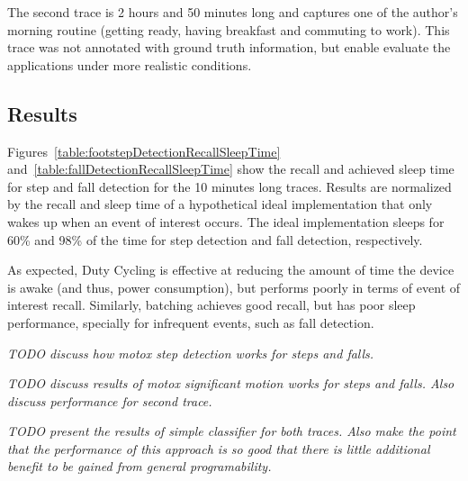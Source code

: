 The second trace is 2 hours and 50 minutes long and captures one of
the author's morning routine (getting ready, having breakfast and
commuting to work). This trace was not annotated with ground truth
information, but enable evaluate the applications under more realistic
conditions.

\subsection{Results}

Figures~\ref{table:footstepDetectionRecallSleepTime}
and~\ref{table:fallDetectionRecallSleepTime} show the recall and
achieved sleep time for step and fall detection for the 10 minutes
long traces.  Results are normalized by the recall and sleep time of a
hypothetical ideal implementation that only wakes up when an event of
interest occurs.  The ideal implementation sleeps for 60\% and 98\% of
the time for step detection and fall detection, respectively.

As expected, Duty Cycling is effective at reducing the amount of time
the device is awake (and thus, power consumption), but performs poorly
in terms of event of interest recall.  Similarly, batching achieves
good recall, but has poor sleep performance, specially for infrequent
events, such as fall detection.


{\em TODO discuss how motox step detection works for steps and falls.}

{\em TODO discuss results of motox significant motion works for steps
  and falls.  Also discuss performance for second trace.}


{\em TODO present the results of simple classifier for both traces.
  Also make the point that the performance of this approach is so good
  that there is little additional benefit to be gained from general
  programability.}







 